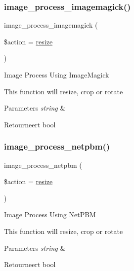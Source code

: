 \subsubsection{\texorpdfstring{image\_process\_imagemagick()}{image\_process\_imagemagick()}}
{\footnotesize\ttfamily image\+\_\+process\+\_\+imagemagick (\begin{DoxyParamCaption}\item[{}]{\$action = {\ttfamily \textquotesingle{}\mbox{\hyperlink{class_c_i___image__lib_a94e38a7d478ce07200a52c51497e598e}{resize}}\textquotesingle{}} }\end{DoxyParamCaption})}

Image Process Using Image\+Magick

This function will resize, crop or rotate


\begin{DoxyParams}{Parameters}
{\em string} & \\
\hline
\end{DoxyParams}
\begin{DoxyReturn}{Retourneert}
bool 
\end{DoxyReturn}
\mbox{\label{class_c_i___image__lib_ab40d1235dccf0611ef4fe5a6b0272dd3}} 
\subsubsection{\texorpdfstring{image\_process\_netpbm()}{image\_process\_netpbm()}}
{\footnotesize\ttfamily image\+\_\+process\+\_\+netpbm (\begin{DoxyParamCaption}\item[{}]{\$action = {\ttfamily \textquotesingle{}\mbox{\hyperlink{class_c_i___image__lib_a94e38a7d478ce07200a52c51497e598e}{resize}}\textquotesingle{}} }\end{DoxyParamCaption})}

Image Process Using Net\+P\+BM

This function will resize, crop or rotate


\begin{DoxyParams}{Parameters}
{\em string} & \\
\hline
\end{DoxyParams}
\begin{DoxyReturn}{Retourneert}
bool 
\end{DoxyReturn}
\mbox{\label{class_c_i___image__lib_a55ee590fb313c50e99d6c1d4cd9618d2}} 
